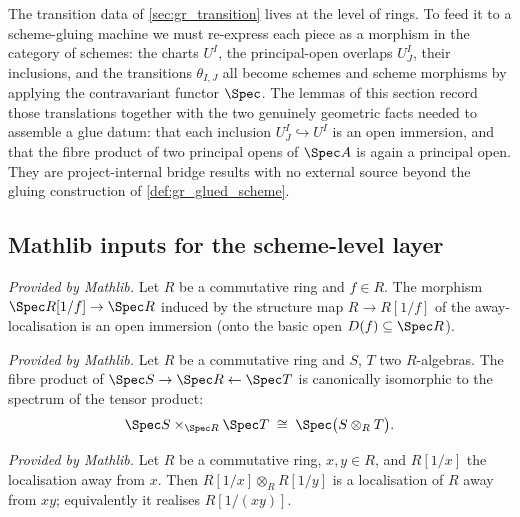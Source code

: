 The transition data of \cref{sec:gr_transition} lives at the level of rings. To
feed it to a scheme-gluing machine we must re-express each piece as a morphism in
the category of schemes: the charts \(U^I\), the principal-open overlaps
\(U^I_J\), their inclusions, and the transitions \(\theta_{I,J}\) all become
schemes and scheme morphisms by applying the contravariant functor \(\Spec\).
The lemmas of this section record those translations together with the two
genuinely geometric facts needed to assemble a glue datum: that each inclusion
\(U^I_J \hookrightarrow U^I\) is an open immersion, and that the fibre product of
two principal opens of \(\Spec A\) is again a principal open. They are
project-internal bridge results with no external source beyond the gluing
construction of \cref{def:gr_glued_scheme}.

\subsection*{Mathlib inputs for the scheme-level layer}

\begin{lemma}
  \label{lem:mathlib_specMap_localizationAway_isOpenImmersion}
  \mathlibok
  \textit{Provided by Mathlib.}
  Let \(R\) be a commutative ring and \(f \in R\). The morphism
  \(\Spec R[1/f] \to \Spec R\) induced by the structure map \(R \to R[1/f]\) of
  the away-localisation is an open immersion (onto the basic open
  \(D(f) \subseteq \Spec R\)).
\end{lemma}

\begin{lemma}
  \label{lem:mathlib_pullbackSpecIso}
  \mathlibok
  \textit{Provided by Mathlib.}
  Let \(R\) be a commutative ring and \(S\), \(T\) two \(R\)-algebras. The fibre
  product of \(\Spec S \to \Spec R \leftarrow \Spec T\) is canonically isomorphic
  to the spectrum of the tensor product:
  \[
    \Spec S \times_{\Spec R} \Spec T \;\cong\; \Spec\bigl(S \otimes_R T\bigr).
  \]
\end{lemma}

\begin{lemma}
  \label{lem:mathlib_isLocalization_away_mul}
  \mathlibok
  \textit{Provided by Mathlib.}
  Let \(R\) be a commutative ring, \(x, y \in R\), and \(R[1/x]\) the localisation
  away from \(x\). Then \(R[1/x] \otimes_R R[1/y]\) is a localisation of \(R\)
  away from \(x y\); equivalently it realises \(R[1/(xy)]\).
\end{lemma}

